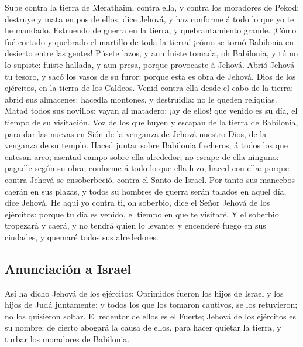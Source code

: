  Sube contra la tierra de Merathaim, contra ella, y
contra los moradores de Pekod: destruye y mata en pos de ellos, dice
Jehová, y haz conforme á todo lo que yo te he mandado. 
Estruendo de guerra en la tierra, y quebrantamiento grande.
 ¡Cómo fué cortado y quebrado el martillo de toda la
tierra! ¡cómo se tornó Babilonia en desierto entre las gentes!
 Púsete lazos, y aun fuiste tomada, oh Babilonia, y tú no
lo supiste: fuiste hallada, y aun presa, porque provocaste á Jehová.
 Abrió Jehová tu tesoro, y sacó los vasos de su furor:
porque esta es obra de Jehová, Dios de los ejércitos, en la tierra de
los Caldeos.  Venid contra ella desde el cabo de la
tierra: abrid sus almacenes: hacedla montones, y destruidla: no le
queden reliquias.  Matad todos sus novillos; vayan al
matadero: ¡ay de ellos! que venido es su día, el tiempo de su
visitación.  Voz de los que huyen y escapan de la tierra
de Babilonia, para dar las nuevas en Sión de la venganza de Jehová
nuestro Dios, de la venganza de su templo.  Haced juntar
sobre Babilonia flecheros, á todos los que entesan arco; asentad campo
sobre ella alrededor; no escape de ella ninguno: pagadle según su obra;
conforme á todo lo que ella hizo, haced con ella: porque contra Jehová
se ensoberbeció, contra el Santo de Israel.  Por tanto
sus mancebos caerán en sus plazas, y todos su hombres de guerra serán
talados en aquel día, dice Jehová.  He aquí yo contra ti,
oh soberbio, dice el Señor Jehová de los ejércitos: porque tu día es
venido, el tiempo en que te visitaré.  Y el soberbio
tropezará y caerá, y no tendrá quien lo levante: y encenderé fuego en
sus ciudades, y quemaré todos sus alrededores.

\hypertarget{anunciaciuxf3n-a-israel}{%
\subsection{Anunciación a Israel}\label{anunciaciuxf3n-a-israel}}

 Así ha dicho Jehová de los ejércitos: Oprimidos fueron
los hijos de Israel y los hijos de Judá juntamente: y todos los que los
tomaron cautivos, se los retuvieron; no los quisieron soltar.
 El redentor de ellos es el Fuerte; Jehová de los
ejércitos es su nombre: de cierto abogará la causa de ellos, para hacer
quietar la tierra, y turbar los moradores de Babilonia.

